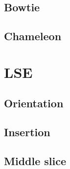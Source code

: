\documentclass[a4paper]{scrreprt}
\begin{document}
\subsection{Bowtie}
\subsection{Chameleon}

\section{LSE}
\subsection{Orientation}
\subsection{Insertion}
\subsection{Middle slice}
\end{document}
